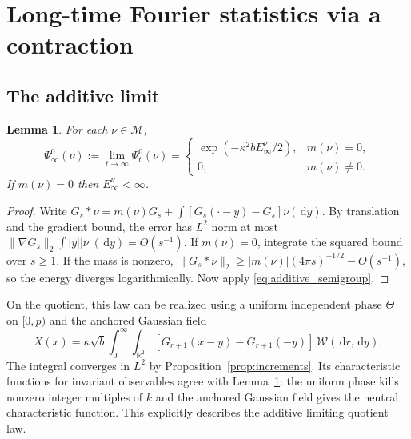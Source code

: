 \documentclass[11pt]{article}
\numberwithin{equation}{section}
\newtheorem{lemma}[theorem]{Lemma}
\theoremstyle{definition}
\theoremstyle{remark}
\newcommand{\R}{\mathbb R}
\newcommand{\dd}{\,\mathrm d}
\begin{document}
\section{Long-time Fourier statistics via a contraction}\label{sec:contraction}
\subsection{The additive limit}
\begin{lemma}\label{lem:additive}
For each $\nu\in\mathcal M$,
\[
 \Psi_\infty^0(\nu):=\lim_{t\to\infty}\Psi_t^0(\nu)
 =\begin{cases}
 \exp(-\kappa^2 b E_\infty^\nu/2),&m(\nu)=0,\\
 0,&m(\nu)\ne0.
 \end{cases}
\]
If $m(\nu)=0$ then $E_\infty^\nu<\infty$.
\end{lemma}
\begin{proof}
Write $G_s*\nu=m(\nu)G_s+\int [G_s(\cdot-y)-G_s]\nu(\dd y)$. By translation and the gradient bound, the error has $L^2$ norm at most $\|\nabla G_s\|_2\int|y||\nu|(\dd y)=O(s^{-1})$. If $m(\nu)=0$, integrate the squared bound over $s\ge1$. If the mass is nonzero, $\|G_s*\nu\|_2\ge |m(\nu)|(4\pi s)^{-1/2}-O(s^{-1})$, so the energy diverges logarithmically. Now apply \eqref{eq:additive_semigroup}.
\end{proof}
On the quotient, this law can be realized using a uniform independent phase $\Theta$ on $[0,p)$ and the anchored Gaussian field
\begin{equation}\label{eq:gauss_anchor}
 X(x)=\kappa\sqrt b\int_0^\infty\int_{\R^2}
 [G_{r+1}(x-y)-G_{r+1}(-y)]\,\mathcal W(\dd r,\dd y).
\end{equation}
The integral converges in $L^2$ by Proposition~\ref{prop:increments}. Its characteristic functions for invariant observables agree with Lemma~\ref{lem:additive}: the uniform phase kills nonzero integer multiples of $k$ and the anchored Gaussian field gives the neutral characteristic function. This explicitly describes the additive limiting quotient law.
\end{document}
